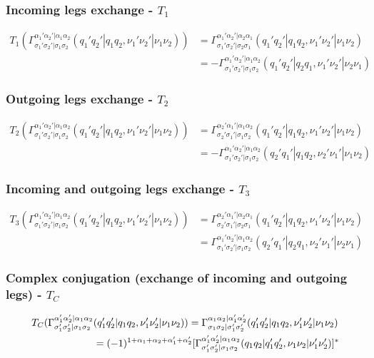 \documentclass[12pt,a4paper,roman]{article}
\begin{document}
\subsubsection*{Incoming legs exchange - $T_1$}
\begin{align}
    T_1 \left( \Gamma_{\sigma_1'\sigma_2'|\sigma_1\sigma_2}^{\alpha_1'\alpha_2'|\alpha_1\alpha_2}(q_1'q_2'|q_1q_2, \nu_1'\nu_2'|\nu_1\nu_2) \right) &= \Gamma_{\sigma_1'\sigma_2'|\sigma_2\sigma_1}^{\alpha_1'\alpha_2'|\alpha_2\alpha_1}(q_1'q_2'|q_1q_2, \nu_1'\nu_2'|\nu_1\nu_2)\\
    &= -\Gamma_{\sigma_1'\sigma_2'|\sigma_1\sigma_2}^{\alpha_1'\alpha_2'|\alpha_1\alpha_2}(q_1'q_2'|q_2q_1, \nu_1'\nu_2'|\nu_2\nu_1)
    \label{eq:t1}
\end{align}

\subsubsection*{Outgoing legs exchange - $T_2$}
\begin{align}
    T_2 \left( \Gamma_{\sigma_1'\sigma_2'|\sigma_1\sigma_2}^{\alpha_1'\alpha_2'|\alpha_1\alpha_2}(q_1'q_2'|q_1q_2, \nu_1'\nu_2'|\nu_1\nu_2) \right) &= \Gamma_{\sigma_2'\sigma_1'|\sigma_1\sigma_2}^{\alpha_2'\alpha_1'|\alpha_1\alpha_2}(q_1'q_2'|q_1q_2, \nu_1'\nu_2'|\nu_1\nu_2)\\
    &= -\Gamma_{\sigma_1'\sigma_2'|\sigma_1\sigma_2}^{\alpha_1'\alpha_2'|\alpha_1\alpha_2}(q_2'q_1'|q_1q_2, \nu_2'\nu_1'|\nu_1\nu_2)
    \label{eq:t2}
\end{align}

\subsubsection*{Incoming and outgoing legs exchange - $T_3$}
\begin{align}
    T_3 \left( \Gamma_{\sigma_1'\sigma_2'|\sigma_1\sigma_2}^{\alpha_1'\alpha_2'|\alpha_1\alpha_2}(q_1'q_2'|q_1q_2, \nu_1'\nu_2'|\nu_1\nu_2) \right) &= \Gamma_{\sigma_2'\sigma_1'|\sigma_2\sigma_1}^{\alpha_2'\alpha_1'|\alpha_2\alpha_1}(q_1'q_2'|q_1q_2, \nu_1'\nu_2'|\nu_1\nu_2)\\
    &= \Gamma_{\sigma_1'\sigma_2'|\sigma_1\sigma_2}^{\alpha_1'\alpha_2'|\alpha_1\alpha_2}(q_2'q_1'|q_2q_1, \nu_2'\nu_1'|\nu_2\nu_1)
    \label{eq:t3}
\end{align}

\subsubsection*{Complex conjugation (exchange of incoming and outgoing legs) - $T_C$}
\begin{align}
    T_C \large( \Gamma_{\sigma_1'\sigma_2'|\sigma_1\sigma_2}^{\alpha_1'\alpha_2'|\alpha_1\alpha_2}&(q_1'q_2'|q_1q_2, \nu_1'\nu_2'|\nu_1\nu_2) \large) = \Gamma_{\sigma_1\sigma_2|\sigma_1'\sigma_2'}^{\alpha_1\alpha_2|\alpha_1'\alpha_2'}(q_1'q_2'|q_1q_2, \nu_1'\nu_2'|\nu_1\nu_2)\\
    &=(-1)^{1+\alpha_1+\alpha_2+\alpha_1'+\alpha_2'}[ \Gamma_{\sigma_1'\sigma_2'|\sigma_1\sigma_2}^{\alpha_1'\alpha_2'|\alpha_1\alpha_2}(q_1q_2|q_1'q_2', \nu_1\nu_2|\nu_1'\nu_2')]^*
    \label{eq:tc}
\end{align}
\end{document}
